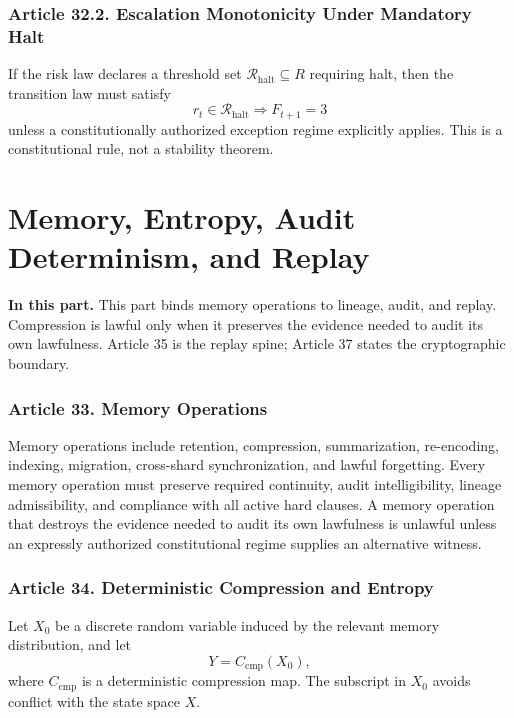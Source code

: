 \documentclass[10pt,oneside]{article}
\theoremstyle{definition}
\theoremstyle{remark}
\newcommand{\cmp}{\mathrm{cmp}}
\newcommand{\PartIntro}[1]{\noindent\textbf{In this part.} #1\par\medskip}
\begin{document}
\section{Article 32.2. Escalation Monotonicity Under Mandatory Halt}
If the risk law declares a threshold set \(\mathcal{R}_{\mathrm{halt}}\subseteq R\) requiring halt, then the transition law must satisfy
\[
r_t\in\mathcal{R}_{\mathrm{halt}}\Longrightarrow F_{t+1}=3
\]
unless a constitutionally authorized exception regime explicitly applies. This is a constitutional rule, not a stability theorem.

\part{Memory, Entropy, Audit Determinism, and Replay}

\PartIntro{This part binds memory operations to lineage, audit, and replay. Compression is lawful only when it preserves the evidence needed to audit its own lawfulness. Article 35 is the replay spine; Article 37 states the cryptographic boundary.}

\section{Article 33. Memory Operations}
Memory operations include retention, compression, summarization, re-encoding, indexing, migration, cross-shard synchronization, and lawful forgetting. Every memory operation must preserve required continuity, audit intelligibility, lineage admissibility, and compliance with all active hard clauses. A memory operation that destroys the evidence needed to audit its own lawfulness is unlawful unless an expressly authorized constitutional regime supplies an alternative witness.

\section{Article 34. Deterministic Compression and Entropy}
Let \(X_0\) be a discrete random variable induced by the relevant memory distribution, and let
\[
Y=C_{\cmp}(X_0),
\]
where \(C_{\cmp}\) is a deterministic compression map. The subscript in \(X_0\) avoids conflict with the state space \(X\).
\end{document}
